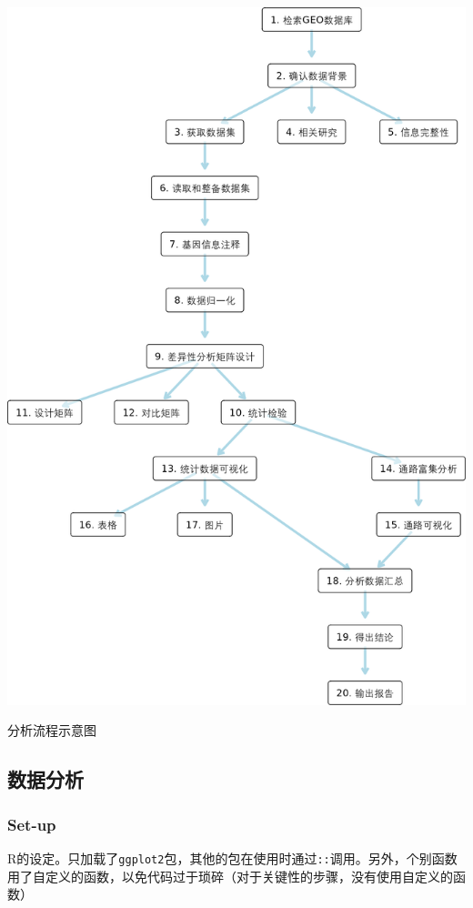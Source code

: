\documentclass[
]{article}
\begin{document}
\bgroup {}
\includegraphics[width=23.22in]{thesis_fig/GEO_case} \caption{分析流程示意图}\label{fig:GEOflow}
\makeatletter \egroup

\hypertarget{steps}{%
\subsection{数据分析}\label{steps}}

\hypertarget{set-up}{%
\subsubsection{Set-up}\label{set-up}}

R的设定。只加载了\texttt{ggplot2}包，其他的包在使用时通过\texttt{::}调用。另外，个别函数用了自定义的函数，以免代码过于琐碎（对于关键性的步骤，没有使用自定义的函数）
\end{document}
